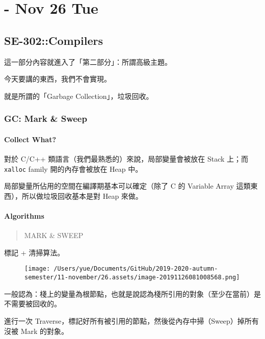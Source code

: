 \documentclass[
]{article}
\date{}
\begin{document}
\hypertarget{header-n2}{%
\section{- Nov 26 Tue}\label{header-n2}}

\hypertarget{header-n3}{%
\subsection{SE-302::Compilers}\label{header-n3}}

這一部分內容就進入了「第二部分」：所謂高級主題。

今天要講的東西，我們不會實現。

就是所謂的「Garbage Collection」，垃圾回收。

\hypertarget{header-n7}{%
\subsubsection{GC: Mark \& Sweep}\label{header-n7}}

\hypertarget{header-n8}{%
\paragraph{Collect What?}\label{header-n8}}

對於 C/C++ 類語言（我們最熟悉的）來說，局部變量會被放在 Stack 上；而
\texttt{xalloc} family 開的內存會被放在 Heap 中。

局部變量所佔用的空間在編譯期基本可以確定（除了 C 的 Variable Array
這類東西），所以做垃圾回收基本是對 Heap 來做。

\hypertarget{header-n11}{%
\paragraph{Algorithms}\label{header-n11}}

\begin{quote}
MARK \& SWEEP
\end{quote}

標記 + 清掃算法。

\begin{figure}
\centering
\texttt{[image: /Users/yue/Documents/GitHub/2019-2020-autumn-semester/11-november/26.assets/image-20191126081008568.png]}
\caption{}
\end{figure}

一般認為：棧上的變量為根節點，也就是說認為棧所引用的對象（至少在當前）是不需要被回收的。

進行一次
Traverse，標記好所有被引用的節點，然後從內存中掃（Sweep）掉所有沒被 Mark
的對象。
\end{document}
